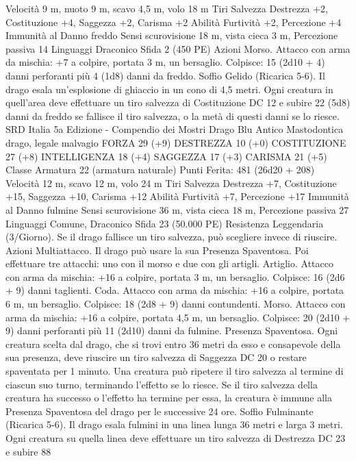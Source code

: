 \begin{multicols}{2}
Velocità 9 m, nuoto 9 m, scavo 4,5 m, volo 18 m
Tiri Salvezza Destrezza +2, Costituzione +4, Saggezza +2,
Carisma +2
Abilità Furtività +2, Percezione +4
Immunità al Danno freddo
Sensi scurovisione 18 m, vista cieca 3 m, Percezione passiva 14
Linguaggi Draconico
Sfida 2 (450 PE)
Azioni
Morso. Attacco con arma da mischia: +7 a colpire, portata 3 m,
un bersaglio.
Colpisce: 15 (2d10 + 4) danni perforanti più 4 (1d8) danni da freddo.
Soffio Gelido (Ricarica 5-6). Il drago esala un’esplosione di ghiaccio
in un cono di 4,5 metri. Ogni creatura in quell’area deve effettuare un
tiro salvezza di Costituzione DC 12 e subire 22 (5d8) danni da freddo
se fallisce il tiro salvezza, o la metà di questi danni se lo riesce.
SRD Italia 5a Edizione - Compendio dei Mostri
Drago Blu Antico
Mastodontica drago, legale malvagio
FORZA 29 (+9)
DESTREZZA 10 (+0)
COSTITUZIONE 27 (+8)
INTELLIGENZA 18 (+4)
SAGGEZZA 17 (+3)
CARISMA 21 (+5)
Classe Armatura 22 (armatura naturale)
\hspace*{0pt}\hfill{Punti Ferita}: 481 (26d20 + 208)
Velocità 12 m, scavo 12 m, volo 24 m
Tiri Salvezza Destrezza +7, Costituzione +15, Saggezza +10,
Carisma +12
Abilità Furtività +7, Percezione +17
Immunità al Danno fulmine
Sensi scurovisione 36 m, vista cieca 18 m, Percezione passiva 27
Linguaggi Comune, Draconico
Sfida 23 (50.000 PE)
Resistenza Leggendaria (3/Giorno). Se il drago fallisce un tiro
salvezza, può scegliere invece di riuscire.
Azioni
Multiattacco. Il drago può usare la sua Presenza Spaventosa. Poi
effettuare tre attacchi: uno con il morso e due con gli artigli.
Artiglio. Attacco con arma da mischia: +16 a colpire, portata 3
m, un bersaglio.
Colpisce: 16 (2d6 + 9) danni taglienti.
Coda. Attacco con arma da mischia: +16 a colpire, portata 6 m,
un bersaglio.
Colpisce: 18 (2d8 + 9) danni contundenti.
Morso. Attacco con arma da mischia: +16 a colpire, portata 4,5
m, un bersaglio.
Colpisce: 20 (2d10 + 9) danni perforanti più 11 (2d10) danni da
fulmine.
Presenza Spaventosa. Ogni creatura scelta dal drago, che si trovi
entro 36 metri da esso e consapevole della sua presenza, deve
riuscire un tiro salvezza di Saggezza DC 20 o restare spaventata
per 1 minuto. Una creatura può ripetere il tiro salvezza al termine
di ciascun suo turno, terminando l’effetto se lo riesce. Se il tiro
salvezza della creatura ha successo o l’effetto ha termine per
essa, la creatura è immune alla Presenza Spaventosa del drago
per le successive 24 ore.
Soffio Fulminante (Ricarica 5-6). Il drago esala fulmini in una
linea lunga 36 metri e larga 3 metri. Ogni creatura su quella linea
deve effettuare un tiro salvezza di Destrezza DC 23 e subire 88

\end{multicols}
